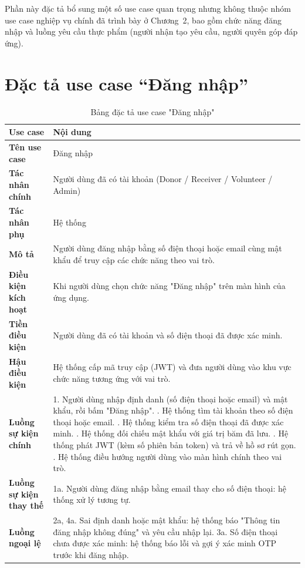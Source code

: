 \documentclass[../main.tex]{subfiles}
\begin{document}
Phần này đặc tả bổ sung một số use case quan trọng nhưng không thuộc nhóm use case nghiệp vụ chính đã trình bày ở Chương~2, bao gồm chức năng đăng nhập và luồng yêu cầu thực phẩm (người nhận tạo yêu cầu, người quyên góp đáp ứng).

\section{Đặc tả use case ``Đăng nhập''}

\begingroup
\renewcommand{\arraystretch}{1.45}
\begin{longtable}{|p{3.5cm}|p{11.5cm}|}
\caption{Bảng đặc tả use case "Đăng nhập"}
\label{tab:uc_dang_nhap}\\
\hline
\textbf{Use case} & \textbf{Nội dung} \\ \hline
\textbf{Tên use case} & Đăng nhập \\ \hline
\textbf{Tác nhân chính} & Người dùng đã có tài khoản (Donor / Receiver / Volunteer / Admin) \\ \hline
\textbf{Tác nhân phụ} & Hệ thống \\ \hline
\textbf{Mô tả} & Người dùng đăng nhập bằng số điện thoại hoặc email cùng mật khẩu để truy cập các chức năng theo vai trò. \\ \hline
\textbf{Điều kiện kích hoạt} & Khi người dùng chọn chức năng "Đăng nhập" trên màn hình của ứng dụng. \\ \hline
\textbf{Tiền điều kiện} & Người dùng đã có tài khoản và số điện thoại đã được xác minh. \\ \hline
\textbf{Hậu điều kiện} & Hệ thống cấp mã truy cập (JWT) và đưa người dùng vào khu vực chức năng tương ứng với vai trò. \\ \hline
\textbf{Luồng sự kiện chính} &
1. Người dùng nhập định danh (số điện thoại hoặc email) và mật khẩu, rồi bấm "Đăng nhập". \newline
2. Hệ thống tìm tài khoản theo số điện thoại hoặc email. \newline
3. Hệ thống kiểm tra số điện thoại đã được xác minh. \newline
4. Hệ thống đối chiếu mật khẩu với giá trị băm đã lưu. \newline
5. Hệ thống phát JWT (kèm số phiên bản token) và trả về hồ sơ rút gọn. \newline
6. Hệ thống điều hướng người dùng vào màn hình chính theo vai trò. \\ \hline
\textbf{Luồng sự kiện thay thế} &
1a. Người dùng đăng nhập bằng email thay cho số điện thoại: hệ thống xử lý tương tự. \\ \hline
\textbf{Luồng ngoại lệ} &
2a, 4a. Sai định danh hoặc mật khẩu: hệ thống báo "Thông tin đăng nhập không đúng" và yêu cầu nhập lại. \newline
3a. Số điện thoại chưa được xác minh: hệ thống báo lỗi và gợi ý xác minh OTP trước khi đăng nhập. \\ \hline
\end{longtable}
\endgroup
\end{document}
